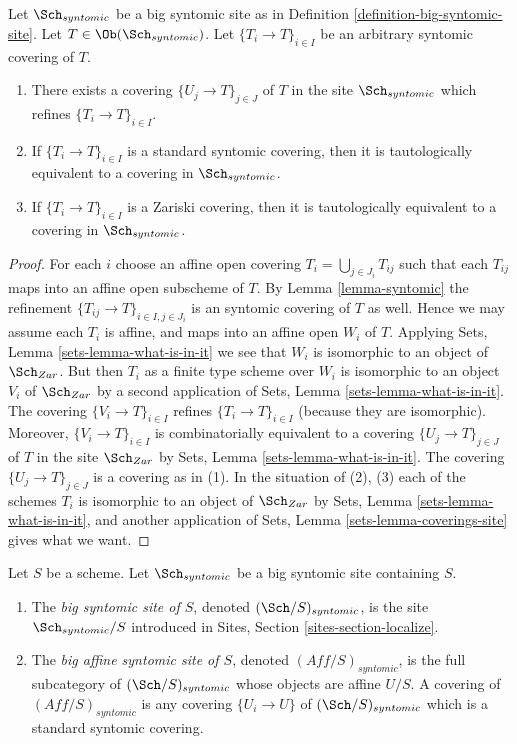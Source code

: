 \begin{lemma}
\label{lemma-syntomic-induced}
Let $\Sch_{syntomic}$ be a big syntomic site as in
Definition \ref{definition-big-syntomic-site}.
Let $T \in \Ob(\Sch_{syntomic})$.
Let $\{T_i \to T\}_{i \in I}$ be an arbitrary syntomic covering of $T$.
\begin{enumerate}
\item There exists a covering $\{U_j \to T\}_{j \in J}$ of $T$ in the site
$\Sch_{syntomic}$ which refines $\{T_i \to T\}_{i \in I}$.
\item If $\{T_i \to T\}_{i \in I}$ is a standard syntomic covering, then
it is tautologically equivalent to a covering in $\Sch_{syntomic}$.
\item If $\{T_i \to T\}_{i \in I}$ is a Zariski covering, then
it is tautologically equivalent to a covering in $\Sch_{syntomic}$.
\end{enumerate}
\end{lemma}

\begin{proof}
For each $i$ choose an affine open covering $T_i = \bigcup_{j \in J_i} T_{ij}$
such that each $T_{ij}$ maps into an affine open subscheme of $T$. By
Lemma \ref{lemma-syntomic}
the refinement $\{T_{ij} \to T\}_{i \in I, j \in J_i}$ is an syntomic covering
of $T$ as well. Hence we may assume each $T_i$ is affine, and maps into
an affine open $W_i$ of $T$. Applying
Sets, Lemma \ref{sets-lemma-what-is-in-it}
we see that $W_i$ is isomorphic to an object of $\Sch_{Zar}$.
But then $T_i$ as a finite type scheme over $W_i$
is isomorphic to an object $V_i$ of $\Sch_{Zar}$ by a second
application of
Sets, Lemma \ref{sets-lemma-what-is-in-it}.
The covering $\{V_i \to T\}_{i \in I}$ refines $\{T_i \to T\}_{i \in I}$
(because they are isomorphic).
Moreover, $\{V_i \to T\}_{i \in I}$ is combinatorially equivalent to a
covering $\{U_j \to T\}_{j \in J}$ of $T$ in the site
$\Sch_{Zar}$ by
Sets, Lemma \ref{sets-lemma-what-is-in-it}.
The covering $\{U_j \to T\}_{j \in J}$ is a covering as in (1).
In the situation of (2), (3) each of the
schemes $T_i$ is isomorphic to an object of $\Sch_{Zar}$ by
Sets, Lemma \ref{sets-lemma-what-is-in-it},
and another application of
Sets, Lemma \ref{sets-lemma-coverings-site}
gives what we want.
\end{proof}

\begin{definition}
\label{definition-big-small-syntomic}
Let $S$ be a scheme. Let $\Sch_{syntomic}$ be a big syntomic
site containing $S$.
\begin{enumerate}
\item The {\it big syntomic site of $S$}, denoted
$(\Sch/S)_{syntomic}$, is the site $\Sch_{syntomic}/S$
introduced in Sites, Section \ref{sites-section-localize}.
\item The {\it big affine syntomic site of $S$}, denoted
$(\textit{Aff}/S)_{syntomic}$, is the full subcategory of
$(\Sch/S)_{syntomic}$ whose objects are affine $U/S$.
A covering of $(\textit{Aff}/S)_{syntomic}$ is any covering
$\{U_i \to U\}$ of $(\Sch/S)_{syntomic}$ which is a
standard syntomic covering.
\end{enumerate}
\end{definition}

